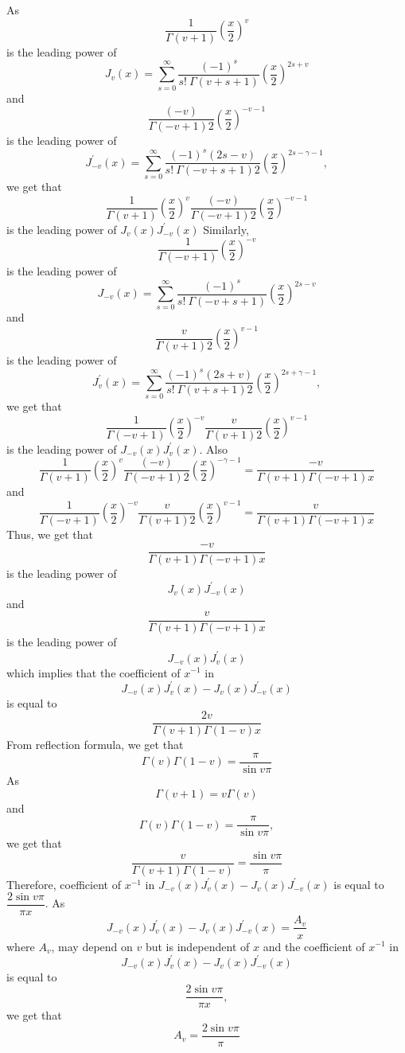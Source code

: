 \documentclass{article}
\begin{document}
\begin{flushleft}
As 
$$\frac{1}{\Gamma(v+1)}\left(\frac{x}{2}\right)^{v}$$ 
is the leading power of 
$$J_{v}(x)=\sum_{s=0}^{\infty} \frac{(-1)^{s}}{s ! \  \Gamma(v+s+1)}\left(\frac{x}{2}\right)^{2 s+v}$$
and
$$\frac{(-v)}{\Gamma(-v+1) 2}\left(\frac{x}{2}\right)^{-v-1}$$ 
is the leading power of 
$$J_{-v}^{\prime}(x)=\sum_{s=0}^{\infty} \frac{(-1)^{s}(2 s-v)}{s ! \  \Gamma(-v+s+1) 2}\left(\frac{x}{2}\right)^{2 s-\gamma-1},$$ 
we get
that 
$$\frac{1}{\Gamma(v+1)}\left(\frac{x}{2}\right)^{v} \frac{(-v)}{\Gamma(-v+1) 2}\left(\frac{x}{2}\right)^{-v-1}$$
is the leading power of $J_{v}(x) J_{-v}^{\prime}(x)$
Similarly, 
$$\frac{1}{\Gamma(-v+1)}\left(\frac{x}{2}\right)^{-v}$$ 
is the leading power of 
$$J_{-v}(x)=\sum_{s=0}^{\infty} \frac{(-1)^{s}}{s ! \  \Gamma(-v+s+1)}\left(\frac{x}{2}\right)^{2 s-v}$$ 
and
$$\frac{v}{\Gamma(v+1) 2}\left(\frac{x}{2}\right)^{v-1}$$ 
is the leading power of 
$$J_{v}^{\prime}(x)=\sum_{s=0}^{\infty} \frac{(-1)^{s}(2 s+v)}{s ! \  \Gamma(v+s+1) 2}\left(\frac{x}{2}\right)^{2 s+\gamma-1},$$ 
we get that
$$\frac{1}{\Gamma(-v+1)}\left(\frac{x}{2}\right)^{-v} \frac{v}{\Gamma(v+1) 2}\left(\frac{x}{2}\right)^{v-1}$$ 
is the leading power of $J_{-v}(x) J_{v}^{\prime}(x)$. Also 
$$\frac{1}{\Gamma(v+1)}\left(\frac{x}{2}\right)^{v} \frac{(-v)}{\Gamma(-v+1) 2}\left(\frac{x}{2}\right)^{-\gamma-1}=\frac{-v}{\Gamma(v+1) \Gamma(-v+1) x}$$ 
and
$$\frac{1}{\Gamma(-v+1)}\left(\frac{x}{2}\right)^{-v} \frac{v}{\Gamma(v+1) 2}\left(\frac{x}{2}\right)^{v-1}=\frac{v}{\Gamma(v+1) \Gamma(-v+1) x}$$
Thus, we get that 
$$\frac{-v}{\Gamma(v+1) \Gamma(-v+1) x}$$ 
is the leading power of 
$$J_{v}(x) J_{-v}^{\prime}(x)$$ 
and
$$\frac{v}{\Gamma(v+1) \Gamma(-v+1) x}$$ 
is the leading power of 
$$J_{-v}(x) J_{v}^{\prime}(x)$$ 
which implies that the coefficient of $x^{-1}$ in 
$$J_{-v}(x) J_{v}^{\prime}(x)-J_{v}(x) J_{-v}^{\prime}(x)$$ 
is equal to 
$$\frac{2 v}{\Gamma(v+1) \Gamma(1-v) x}$$
From reflection formula, we get that 
$$\Gamma(v) \Gamma(1-v)=\frac{\pi}{\sin v \pi}$$
As 
$$\Gamma(v+1)=v \Gamma(v)$$ 
and 
$$\Gamma(v) \Gamma(1-v)=\frac{\pi}{\sin v \pi},$$
we get that 
$$\frac{v}{\Gamma(v+1) \Gamma(1-v)}=\frac{\sin v \pi}{\pi}$$
Therefore, coefficient of $x^{-1}$ in $J_{-v}(x) J_{v}^{\prime}(x)-J_{v}(x) J_{-v}^{\prime}(x)$ is equal to $\dfrac{2 \sin v \pi}{\pi x}$. As 
$$J_{-v}(x) J_{v}^{\prime}(x)-J_{v}(x) J_{-v}^{\prime}(x)=\frac{A_{v}}{x}$$
where $A_{v}$, may depend on $v$ but is independent of $x$ and the coefficient of $x^{-1}$ in 
$$J_{-v}(x) J_{v}^{\prime}(x)-J_{v}(x) J_{-v}^{\prime}(x)$$
is equal to 
$$\frac{2 \sin v \pi}{\pi x},$$
we get that 
$$A_{v}=\frac{2 \sin v \pi}{\pi}$$

\end{flushleft}
\end{document}
